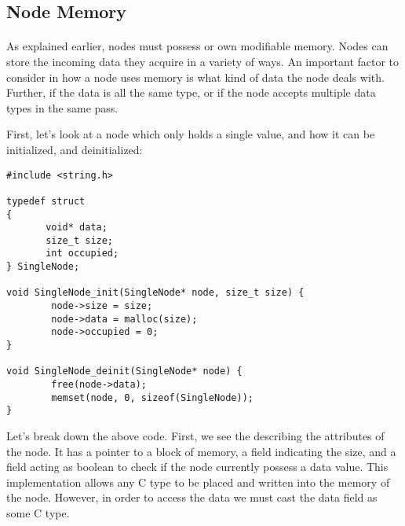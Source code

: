 \subsection{Node Memory}

\paragraph{  }As explained earlier, nodes must possess or own modifiable memory. Nodes can store the incoming data they acquire in a variety of ways. An important factor to consider in how a node uses memory is what kind of data the node deals with. Further, if the data is all the same type, or if the node accepts multiple data types in the same pass.
\par First, let's look at a node which only holds a single value, and how it can be initialized, and deinitialized:

\begin{lstlisting}[style=numc]
#include <string.h>

typedef struct 
{
       void* data;
       size_t size;
       int occupied;
} SingleNode;

void SingleNode_init(SingleNode* node, size_t size) {
        node->size = size;
        node->data = malloc(size);
        node->occupied = 0;
}

void SingleNode_deinit(SingleNode* node) {
        free(node->data);
        memset(node, 0, sizeof(SingleNode));
}
\end{lstlisting}

\par Let's break down the above code. First, we see the  describing the attributes of the node. It has a  pointer to a block of memory, a field indicating the size, and a field acting as boolean to check if the node currently possess a data value. This implementation allows any C type to be placed and written into the memory of the node. However, in order to access the data we must cast the data field as some C type.


